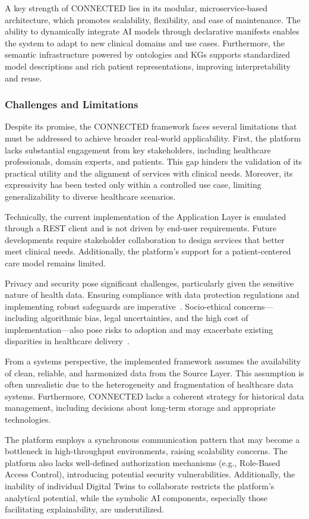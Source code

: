 A key strength of CONNECTED lies in its modular, microservice-based architecture, which promotes scalability, flexibility, and ease of maintenance. The ability to dynamically integrate AI models through declarative manifests enables the system to adapt to new clinical domains and use cases. Furthermore, the semantic infrastructure powered by ontologies and KGs supports standardized model descriptions and rich patient representations, improving interpretability and reuse.
%
\subsubsection{Challenges and Limitations}
Despite its promise, the CONNECTED framework faces several limitations that must be addressed to achieve broader real-world applicability. First, the platform lacks substantial engagement from key stakeholders, including healthcare professionals, domain experts, and patients. This gap hinders the validation of its practical utility and the alignment of services with clinical needs. Moreover, its expressivity has been tested only within a controlled use case, limiting generalizability to diverse healthcare scenarios.

Technically, the current implementation of the Application Layer is emulated through a REST client and is not driven by end-user requirements. Future developments require stakeholder collaboration to design services that better meet clinical needs. Additionally, the platform's support for a patient-centered care model remains limited.

Privacy and security pose significant challenges, particularly given the sensitive nature of health data. Ensuring compliance with data protection regulations and implementing robust safeguards are imperative~\cite{jawad_security_2024}. Socio-ethical concerns—including algorithmic bias, legal uncertainties, and the high cost of implementation—also pose risks to adoption and may exacerbate existing disparities in healthcare delivery~\cite{Katsoulakis2024}.

From a systems perspective, the implemented framework assumes the availability of clean, reliable, and harmonized data from the Source Layer. This assumption is often unrealistic due to the heterogeneity and fragmentation of healthcare data systems. Furthermore, CONNECTED lacks a coherent strategy for historical data management, including decisions about long-term storage and appropriate technologies.

The platform employs a synchronous communication pattern that may become a bottleneck in high-throughput environments, raising scalability concerns. The platform also lacks well-defined authorization mechanisms (e.g., Role-Based Access Control), introducing potential security vulnerabilities. Additionally, the inability of individual Digital Twins to collaborate restricts the platform’s analytical potential, while the symbolic AI components, especially those facilitating explainability, are underutilized.

